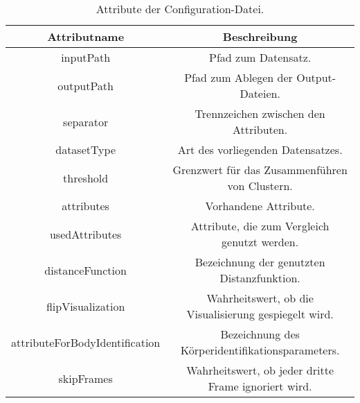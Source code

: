 \begin{table}[ht]
    \begin{center}
        \begin{tabular}{ |c|c| } 
            \hline
            Attributname & Beschreibung \\
            \hline \hline
            inputPath & Pfad zum Datensatz. \\
            \hline
            outputPath & Pfad zum Ablegen der Output-Dateien.  \\
            \hline
            separator & Trennzeichen zwischen den Attributen. \\
            \hline
            datasetType & Art des vorliegenden Datensatzes. \\
            \hline
            threshold & Grenzwert für das Zusammenführen von Clustern. \\
            \hline
            attributes & Vorhandene Attribute. \\
            \hline
            usedAttributes & Attribute, die zum Vergleich genutzt werden. \\
            \hline
            distanceFunction & Bezeichnung der genutzten Distanzfunktion. \\
            \hline
            flipVisualization & Wahrheitswert, ob die Visualisierung gespiegelt wird. \\
            \hline
            attributeForBodyIdentification & Bezeichnung des Körperidentifikationsparameters. \\
            \hline
            skipFrames & Wahrheitswert, ob jeder dritte Frame ignoriert wird. \\
            \hline
        \end{tabular}
        \caption{Attribute der Configuration-Datei.}
        \label{tbl:AttributesConfig}
    \end{center}
\end{table}

